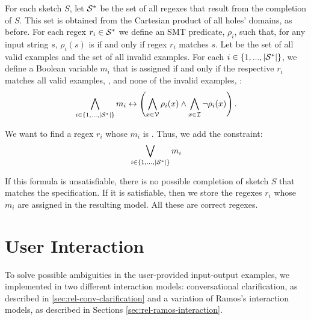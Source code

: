 For each sketch \(S\), let \({\mathcal{S}}^*\) be the set of all regexes that result from the completion of \(S\). This set is obtained from the Cartesian product of all holes' domains, as before. For each regex \(r_i \in {\ensuremath{\mathcal{S}}}^*\) we define an SMT predicate, \(\rho_i\), such that, for any input string \(s\), \(\rho_i(s)\) is \true if and only if regex \(r_i\) matches \(s\). Let  be the set of all valid examples and  the set of all invalid examples. For each \(i \in \{1, ..., |{\mathcal{S}}^*|\}\), we define a Boolean variable \(m_i\) that is assigned \true if and only if the respective \(r_i\) matches all valid examples, , and none of the invalid examples, :
\begin{equation}
    \bigwedge_{i \in \{1, ..., |{\mathcal{S}}^*|\}} m_i \leftrightarrow
    \left( \bigwedge_{x \in {\ensuremath{\mathcal{V}}}} \rho_i(x) \land \bigwedge_{x \in {\ensuremath{\mathcal{I}}}} \neg \rho_i(x) \right).
\end{equation}

\noindent
We want to find a regex \(r_i\) whose \(m_i\) is \true. Thus, we add the constraint:
\begin{equation}
    \bigvee_{i \in \{1, ..., |{\mathcal{S}}^*|\}} m_i
\end{equation}

If this formula is unsatisfiable, there is no possible completion of sketch \(S\) that matches the specification. If it is satisfiable, then we store the regexes \(r_i\) whose \(m_i\) are assigned \true in the resulting model. All these are correct regexes.


\section{User Interaction} \label{sec:regex-interaction}

To solve possible ambiguities in the user-provided input-output examples, we implemented in \Forest{} two different interaction models: conversational clarification, as described in \autoref{sec:rel-conv-clarification} and a variation of Ramos's interaction models, as described in Sections \ref{sec:rel-ramos-interaction}.

